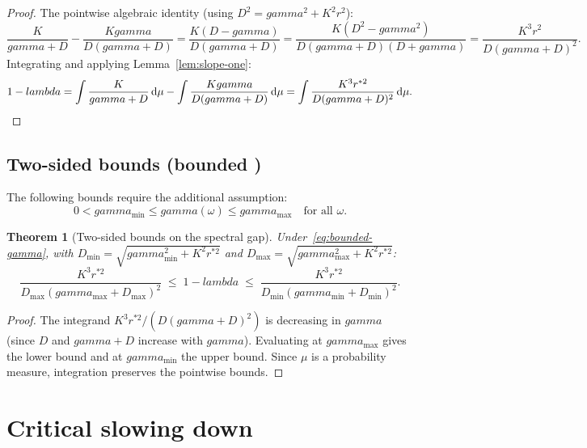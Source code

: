 \documentclass[11pt,a4paper]{article}
\makeatletter
\let\lambda\relax\def\lambda{lambda}%
\let\gamma\relax\def\gamma{gamma}%
\let\texorpdfstring\@secondoftwo}
\newtheorem{theorem}{Theorem}[section]
\theoremstyle{definition}
\makeatother
\begin{document}
\begin{proof}
The pointwise algebraic identity (using $D^2 = \gamma^2 + K^2 r^2$):
\[
\frac{K}{\gamma + D} - \frac{K\gamma}{D(\gamma + D)} = \frac{K(D - \gamma)}{D(\gamma + D)} = \frac{K(D^2 - \gamma^2)}{D(\gamma + D)(D + \gamma)} = \frac{K^3 r^2}{D(\gamma + D)^2}.
\]
Integrating and applying Lemma~\ref{lem:slope-one}:
\[
1 - \lambda = \int \frac{K}{\gamma + D}\,\mathrm{d}\mu - \int \frac{K\gamma}{D(\gamma + D)}\,\mathrm{d}\mu = \int \frac{K^3 r^{*2}}{D(\gamma + D)^2}\,\mathrm{d}\mu. \qedhere
\]
\end{proof}

\subsection{Two-sided bounds (bounded \texorpdfstring{$\gamma$}{gamma})}

The following bounds require the additional assumption:
\begin{equation}\label{eq:bounded-gamma}\tag{H4}
0 < \gamma_{\min} \leq \gamma(\omega) \leq \gamma_{\max} \quad \text{for all } \omega.
\end{equation}

\begin{theorem}[Two-sided bounds on the spectral gap]\label{thm:gap-bounds}
Under~\eqref{eq:bounded-gamma}, with $D_{\min} = \sqrt{\gamma_{\min}^2 + K^2 r^{*2}}$ and $D_{\max} = \sqrt{\gamma_{\max}^2 + K^2 r^{*2}}$:
\begin{equation}\label{eq:gap-two-sided}
\frac{K^3 r^{*2}}{D_{\max}(\gamma_{\max} + D_{\max})^2} \;\leq\; 1 - \lambda \;\leq\; \frac{K^3 r^{*2}}{D_{\min}(\gamma_{\min} + D_{\min})^2}.
\end{equation}
\end{theorem}

\begin{proof}
The integrand $K^3 r^{*2}/(D(\gamma+D)^2)$ is decreasing in $\gamma$ (since $D$ and $\gamma + D$ increase with $\gamma$). Evaluating at $\gamma_{\max}$ gives the lower bound and at $\gamma_{\min}$ the upper bound. Since $\mu$ is a probability measure, integration preserves the pointwise bounds.
\end{proof}

\section{Critical slowing down}\label{sec:critical-slowing}
\end{document}
